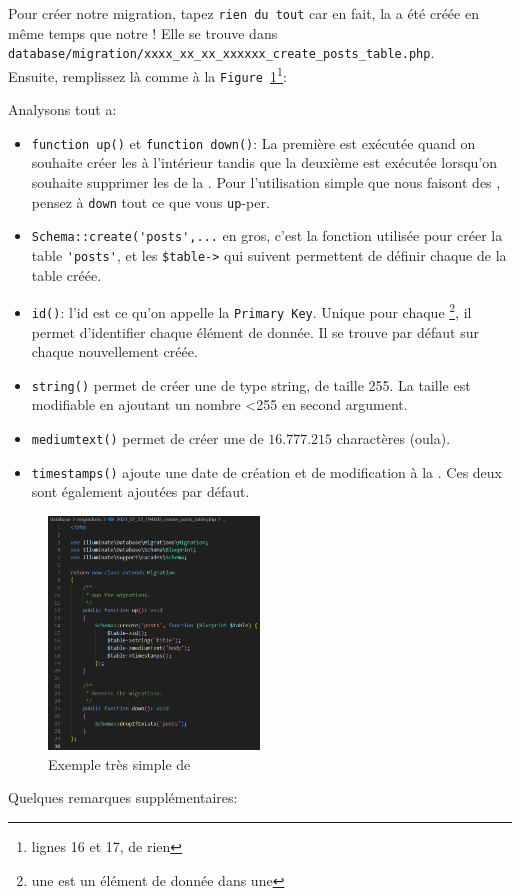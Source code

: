 Pour créer notre migration, tapez \verb|rien du tout| car en fait, la \migration{} a été créée en même temps que notre \model{}! Elle se trouve dans \\\verb|database/migration/xxxx_xx_xx_xxxxxx_create_posts_table.php|. \\Ensuite, remplissez là comme à la \texttt{Figure~\ref{fig:basic_migration}}\footnote{lignes 16 et 17, de rien}:

Analysons tout a:
\begin{itemize}
    \item \verb|function up()| et \verb|function down()|: La première est exécutée quand on souhaite créer les \tables{} à l'intérieur tandis que la deuxième est exécutée lorsqu'on souhaite supprimer les \tables{} de la \db{}. Pour l'utilisation simple que nous faisont des \migrations{}, pensez à \verb|down| tout ce que vous \verb|up|-per.
    \item \verb|Schema::create('posts',...| en gros, c'est la fonction utilisée pour créer la table \verb|'posts'|, et les \verb|$table->| qui suivent permettent de définir chaque \column{} de la table créée.
    \item \verb|id()|: l'id est ce qu'on appelle la \texttt{Primary Key}. Unique pour chaque \row{}\footnote{une \row{} est un élément de donnée dans une \table{}}, il permet d'identifier chaque élément de donnée. Il se trouve par défaut sur chaque \table{} nouvellement créée.
    \item \verb|string()| permet de créer une \column{} de type string, de taille 255. La taille est modifiable en ajoutant un nombre <255 en second argument.
    \item \verb|mediumtext()| permet de créer une \column{} de $16.777.215$ charactères (oula).
    \item \verb|timestamps()| ajoute une date de création et de modification à la \table{}. Ces deux \columns{} sont également ajoutées par défaut.
\end{itemize}

\begin{figure}
    \vspace{-0.5cm}
    \includegraphics[width=0.5\textwidth]{figures-C1/post_migration.pdf}
    \caption{Exemple très simple de \migration{}\label{fig:basic_migration}}
\end{figure}
Quelques remarques supplémentaires:

